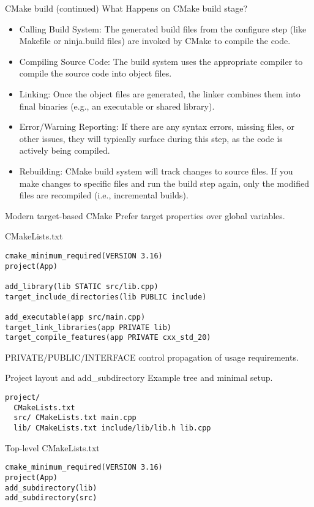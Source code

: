 \documentclass{beamer}
\begin{document}
\begin{frame}{CMake build (continued)}
  What Happens on CMake build stage?
  \begin{itemize}
    \item Calling Build System: The generated build files from the configure step (like Makefile or ninja.build files) are invoked by CMake to compile the code.
    \item Compiling Source Code: The build system uses the appropriate compiler to compile the source code into object files.
    \item Linking: Once the object files are generated, the linker combines them into final binaries (e.g., an executable or shared library).
    \item Error/Warning Reporting: If there are any syntax errors, missing files, or other issues, they will typically surface during this step, as the code is actively being compiled.
    \item Rebuilding: CMake build system will track changes to source files. If you make changes to specific files and run the build step again, only the modified files are recompiled (i.e., incremental builds).
  \end{itemize}
\end{frame}

\begin{frame}[fragile]{Modern target-based CMake}
  Prefer target properties over global variables.
  \begin{block}{CMakeLists.txt}
    \begin{lstlisting}
cmake_minimum_required(VERSION 3.16)
project(App)

add_library(lib STATIC src/lib.cpp)
target_include_directories(lib PUBLIC include)

add_executable(app src/main.cpp)
target_link_libraries(app PRIVATE lib)
target_compile_features(app PRIVATE cxx_std_20)
    \end{lstlisting}
  \end{block}
  PRIVATE/PUBLIC/INTERFACE control propagation of usage requirements.
\end{frame}

\begin{frame}[fragile]{Project layout and add\_subdirectory}
  Example tree and minimal setup.
  \begin{lstlisting}
project/
  CMakeLists.txt
  src/ CMakeLists.txt main.cpp
  lib/ CMakeLists.txt include/lib/lib.h lib.cpp
  \end{lstlisting}
  \begin{block}{Top-level CMakeLists.txt}
    \begin{lstlisting}
cmake_minimum_required(VERSION 3.16)
project(App)
add_subdirectory(lib)
add_subdirectory(src)
    \end{lstlisting}
  \end{block}
\end{frame}
\end{document}
